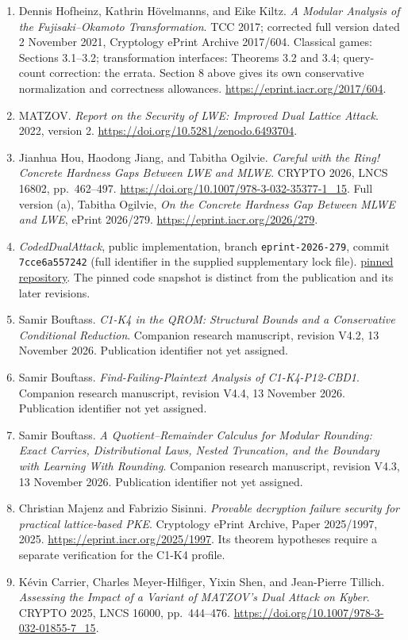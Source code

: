 \documentclass[
  10pt,
  a4paper,
]{article}
\begin{document}
\begin{enumerate}
\def\labelenumi{\arabic{enumi}.}
\item
  Dennis Hofheinz, Kathrin Hövelmanns, and Eike Kiltz. \emph{A Modular
  Analysis of the Fujisaki--Okamoto Transformation}. TCC 2017; corrected
  full version dated 2 November 2021, Cryptology ePrint Archive
  2017/604. Classical games: Sections 3.1--3.2; transformation
  interfaces: Theorems 3.2 and 3.4; query-count correction: the errata.
  Section 8 above gives its own conservative normalization and
  correctness allowances. \url{https://eprint.iacr.org/2017/604}.
\item
  MATZOV. \emph{Report on the Security of LWE: Improved Dual Lattice
  Attack}. 2022, version 2.
  \url{https://doi.org/10.5281/zenodo.6493704}.
\item
  Jianhua Hou, Haodong Jiang, and Tabitha Ogilvie. \emph{Careful with
  the Ring! Concrete Hardness Gaps Between LWE and MLWE}. CRYPTO 2026,
  LNCS 16802, pp.~462--497.
  \url{https://doi.org/10.1007/978-3-032-35377-1_15}. Full version (a),
  Tabitha Ogilvie, \emph{On the Concrete Hardness Gap Between MLWE and
  LWE}, ePrint 2026/279. \url{https://eprint.iacr.org/2026/279}.
\item
  \emph{CodedDualAttack}, public implementation, branch
  \texttt{eprint-2026-279}, commit \texttt{7cce6a557242} (full
  identifier in the supplied supplementary lock file).
  \href{https://github.com/identitymapping/CodedDualAttack/tree/7cce6a5572420004da31be58f26954cedfc885d0}{pinned
  repository}. The pinned code snapshot is distinct from the publication
  and its later revisions.
\item
  Samir Bouftass. \emph{C1-K4 in the QROM: Structural Bounds and a
  Conservative Conditional Reduction}. Companion research manuscript,
  revision V4.2, 13 November 2026. Publication identifier not yet
  assigned.
\item
  Samir Bouftass. \emph{Find-Failing-Plaintext Analysis of
  C1-K4-P12-CBD1}. Companion research manuscript, revision V4.4, 13
  November 2026. Publication identifier not yet assigned.
\item
  Samir Bouftass. \emph{A Quotient--Remainder Calculus for Modular
  Rounding: Exact Carries, Distributional Laws, Nested Truncation, and
  the Boundary with Learning With Rounding}. Companion research
  manuscript, revision V4.3, 13 November 2026. Publication identifier
  not yet assigned.
\item
  Christian Majenz and Fabrizio Sisinni. \emph{Provable decryption
  failure security for practical lattice-based PKE}. Cryptology ePrint
  Archive, Paper 2025/1997, 2025.
  \url{https://eprint.iacr.org/2025/1997}. Its theorem hypotheses
  require a separate verification for the C1-K4 profile.
\item
  Kévin Carrier, Charles Meyer-Hilfiger, Yixin Shen, and Jean-Pierre
  Tillich. \emph{Assessing the Impact of a Variant of MATZOV's Dual
  Attack on Kyber}. CRYPTO 2025, LNCS 16000, pp.~444--476.
  \url{https://doi.org/10.1007/978-3-032-01855-7_15}.
\end{enumerate}
\end{document}
